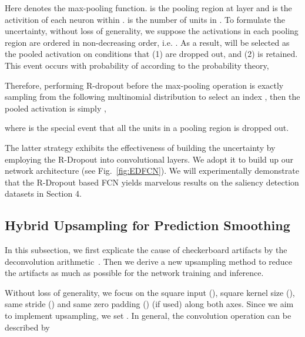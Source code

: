 \documentclass[10pt,twocolumn,letterpaper]{article}
\begin{document}
\vspace{-7mm}

Here  denotes the max-pooling function.  is the pooling region  at layer  and  is the activition of each neuron within .  is the number of units in . To formulate the uncertainty, without loss of generality, we suppose the activations  in each pooling region  are ordered in non-decreasing order, i.e. . As a result,  will be selected as the pooled activation on conditions that (1)  are dropped out, and (2)  is retained.
This event occurs with probability of  according to the probability theory,

Therefore, performing R-dropout before the max-pooling operation is exactly sampling from the following multinomial distribution
to select an index , then the pooled activation is simply ,

where  is the special event that all the units in a pooling region is dropped out.

The latter strategy exhibits the effectiveness of building the uncertainty by employing the R-Dropout into convolutional layers.
We adopt it to build up our network architecture (see Fig.~\ref{fig:EDFCN}).
We will experimentally demonstrate that the R-Dropout based FCN yields marvelous results on the saliency detection datasets in Section 4.
\subsection{Hybrid Upsampling for Prediction Smoothing}
In this subsection, we first explicate the cause of checkerboard artifacts by the deconvolution arithmetic~\cite{vincent2016arithmetic}.
Then we derive a new upsampling method to reduce the artifacts as much as possible for the network training and inference.

Without loss of generality, we focus on the square input (), square kernel size (), same stride () and same zero padding () (if used) along both axes.
Since we aim to implement upsampling, we set .
In general, the convolution operation  can be described by
\end{document}
